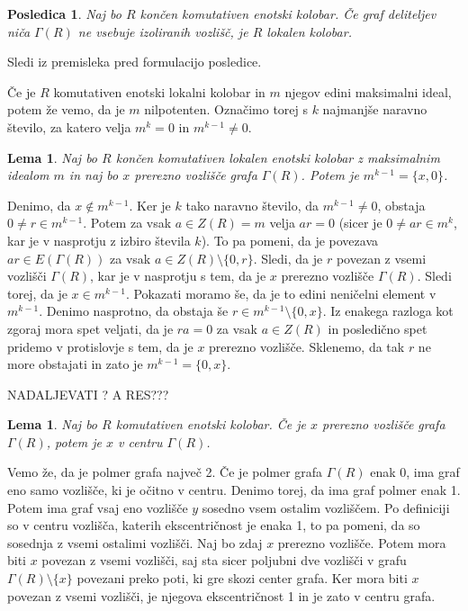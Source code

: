 \documentclass[a4paper, 12pt]{amsart}
\theoremstyle{definition} %
\theoremstyle{plain} %
\newtheorem{lema}[definicija]{Lema}
\newtheorem{posledica}[definicija]{Posledica}
\begin{document}
\begin{posledica}
Naj bo $R$ končen komutativen enotski kolobar. Če graf deliteljev niča $\Gamma(R)$ ne vsebuje izoliranih vozlišč, je $R$ lokalen kolobar.
\end{posledica}

\proof
Sledi iz premisleka pred formulacijo posledice.
\endproof

Če je $R$ komutativen enotski lokalni kolobar in $m$ njegov edini maksimalni ideal, potem že vemo, da je $m$ nilpotenten. Označimo torej s $k$ najmanjše naravno število, za katero velja $m^k = 0$ in $m^{k-1}\neq 0$.

\begin{lema}
\label{localRingCutVertex}
Naj bo $R$ končen komutativen lokalen enotski kolobar z maksimalnim idealom $m$ in naj bo $x$ prerezno vozlišče grafa $\Gamma(R)$. Potem je $m^{k-1} = \{x,0\}$.
\end{lema}

\proof
Denimo, da $x\notin m^{k-1}$. Ker je $k$ tako naravno število, da $m^{k-1} \neq 0$, obstaja $0\neq r \in m^{k-1}$. Potem za vsak $a\in Z(R)=m$ velja $ar = 0 $ (sicer je $0\neq ar \in m^k$, kar je v nasprotju z izbiro števila $k$). To pa pomeni, da je povezava $ar \in E(\Gamma(R))$ za vsak $a\in Z(R)\setminus \{0,r\}$. Sledi, da je $r$ povezan z vsemi vozlišči $\Gamma(R)$, kar je v nasprotju s tem, da je $x$ prerezno vozlišče $\Gamma(R)$. Sledi torej, da je $x\in m^{k-1}$. Pokazati moramo še, da je to edini neničelni element v $m^{k-1}$. Denimo nasprotno, da obstaja še $r\in m^{k-1} \setminus \{0,x\}$. Iz enakega razloga kot zgoraj mora spet veljati, da je $ra = 0$ za vsak $a\in Z(R)$ in posledično spet pridemo v protislovje s tem, da je $x$ prerezno vozlišče. Sklenemo, da tak $r$ ne more obstajati in zato je $m^{k-1} = \{0,x\}$.
\endproof

NADALJEVATI ? A RES???

\begin{lema}
Naj bo $R$ komutativen enotski kolobar. Če je $x$ prerezno vozlišče grafa $\Gamma(R)$, potem  je $x$ v centru $\Gamma(R)$.
\end{lema}

\proof
Vemo že, da je polmer grafa največ 2.
Če je polmer grafa $\Gamma(R)$ enak 0, ima graf eno samo vozlišče, ki je očitno v centru. Denimo torej, da ima graf polmer enak 1. Potem ima graf vsaj eno vozlišče $y$ sosedno vsem ostalim vozliščem. Po definiciji so v centru vozlišča, katerih ekscentričnost je enaka 1, to pa pomeni, da so sosednja z vsemi ostalimi vozlišči. Naj bo zdaj $x$ prerezno vozlišče. Potem mora biti $x$ povezan z vsemi vozlišči, saj sta sicer poljubni dve vozlišči v grafu $\Gamma(R)\setminus \{x\}$ povezani preko poti, ki gre skozi center grafa. Ker mora biti $x$ povezan z vsemi vozlišči, je njegova ekscentričnost 1 in je zato v centru grafa.
\end{document}
